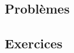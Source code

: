 \documentclass[french]{book}
\newcommand{\N}{\mathbb{N}}
\newcommand{\Z}{\mathbb{Z}}
\newcommand{\U}{\mathbb{U}}
\newcommand{\st}{^*}
\theoremstyle{definition}
\newtheorem{ex}{Exercice}[chapter]
\theoremstyle{remark}
\newtheorem*{sol}{Solution}
\begin{document}


\chapter{}

\section{Problèmes}

\section{Exercices}
\end{document}
